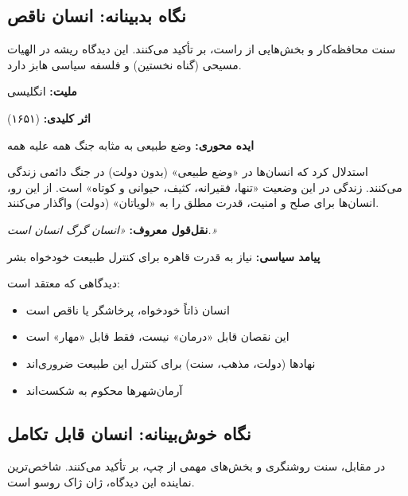 \vspace{-4pt}

\subsection{نگاه بدبینانه: انسان ناقص}

سنت محافظه‌کار و بخش‌هایی از راست، بر  تأکید می‌کنند. این دیدگاه ریشه در الهیات مسیحی (گناه نخستین) و فلسفه سیاسی هابز دارد.

\begin{personbox}
	
	\textbf{ملیت:} انگلیسی
	
	\textbf{اثر کلیدی:}  (۱۶۵۱)
	
	\textbf{ایده محوری:} وضع طبیعی به مثابه جنگ همه علیه همه
	
	\mediumspace
	
	 استدلال کرد که انسان‌ها در «وضع طبیعی» (بدون دولت) در جنگ دائمی زندگی می‌کنند. زندگی در این وضعیت «تنها، فقیرانه، کثیف، حیوانی و کوتاه» است. از این رو، انسان‌ها برای صلح و امنیت، قدرت مطلق را به «لویاتان» (دولت) واگذار می‌کنند.
	
	\mediumspace
	
	\textbf{نقل‌قول معروف:} \textit{«انسان گرگ انسان است.»}
	
	\mediumspace
	
	\textbf{پیامد سیاسی:} نیاز به قدرت قاهره برای کنترل طبیعت خودخواه بشر
\end{personbox}

\begin{defbox}
	دیدگاهی که معتقد است:
	\begin{itemize}[nosep]
		\item انسان ذاتاً خودخواه، پرخاشگر یا ناقص است
		\item این نقصان قابل «درمان» نیست، فقط قابل «مهار» است
		\item نهادها (دولت، مذهب، سنت) برای کنترل این طبیعت ضروری‌اند
		\item آرمان‌شهرها محکوم به شکست‌اند
	\end{itemize}
\end{defbox}

\subsection{نگاه خوش‌بینانه: انسان قابل تکامل}

در مقابل، سنت روشنگری و بخش‌های مهمی از چپ، بر  تأکید می‌کنند. شاخص‌ترین نماینده این دیدگاه، ژان ژاک روسو است.

